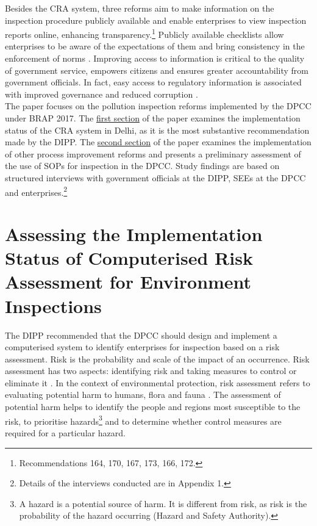 \documentclass[a4paper, 12pt]{article}
\begin{document}
                 Besides the CRA system, three reforms aim to make information on the inspection procedure publicly available and enable enterprises to view inspection reports online, enhancing transparency.\footnote{Recommendations 164, 170, 167, 173, 166, 172.} Publicly available checklists allow enterprises to be aware of the expectations of them and bring consistency in the enforcement of norms \parencite{blancflorentin}. Improving access to information is critical to the quality of government service, empowers citizens and ensures greater accountability from government officials. In fact, easy access to regulatory information is associated with improved governance and reduced corruption \parencite{Saltane}. \\
                 
                 The paper focuses on the pollution inspection reforms implemented by the DPCC under BRAP 2017. The \hyperref[sec:1]{first section} of the paper examines the implementation status of the CRA system in Delhi, as it is the most substantive recommendation made by the DIPP. The \hyperref[sec:2]{second section} of the paper examines the implementation of other process improvement reforms and presents a preliminary assessment of the use of SOPs for inspection in the DPCC. Study findings are based on structured interviews with government officials at the DIPP, SEEs at the DPCC and enterprises.\footnote{Details of the interviews conducted are in Appendix 1.} 
                 
                 \section{Assessing the Implementation Status of Computerised Risk Assessment for Environment Inspections}\label{sec:1} 
                 
                 The DIPP recommended that the DPCC should design and implement a computerised system to identify enterprises for inspection based on a risk assessment. Risk is the probability and scale of the impact of an occurrence. Risk assessment has two aspects: identifying risk and taking measures to control or eliminate it \parencite{Stoneburner}. In the context of environmental protection, risk assessment refers to evaluating potential harm to humans, flora and fauna \parencite{EPAnd}. The assessment of potential harm helps to identify the people and regions most susceptible to the risk, to prioritise hazards\footnote{A hazard is a potential source of harm. It is different from risk, as risk is the probability of the hazard occurring (Hazard and Safety Authority).} and to determine whether control measures are required for a particular hazard. \\
                 
\end{document}
